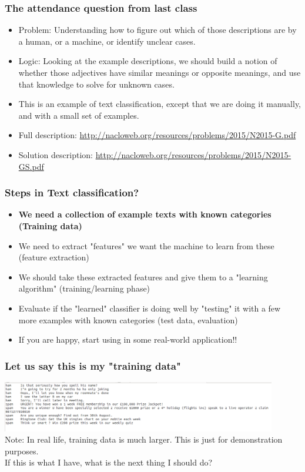 \documentclass{beamer}
\begin{document}
\begin{frame}
\frametitle{The attendance question from last class}
\begin{itemize}
\item Problem: Understanding how to figure out which of those descriptions are by a human, or a machine, or identify unclear cases.
\item Logic: Looking at the example descriptions, we should build a notion of whether those adjectives have similar meanings or opposite meanings, and use that knowledge to solve for unknown cases.
\item This is an example of text classification, except that we are doing it manually, and with a small set of examples. 
\item Full description: \url{http://nacloweb.org/resources/problems/2015/N2015-G.pdf}
\item Solution description: \url{http://nacloweb.org/resources/problems/2015/N2015-GS.pdf}
\end{itemize}
\end{frame}

\begin{frame}
\frametitle{Steps in Text classification?}
\begin{itemize}
\item \textbf{We need a collection of example texts with known categories (Training data)}
\item We need to extract "features" we want the machine to learn from these (feature extraction)
\item We should take these extracted features and give them to a "learning algorithm" (training/learning phase)
\item Evaluate if the "learned" classifier is doing well by "testing" it with a few more examples with known categories (test data, evaluation)
\item If you are happy, start using in some real-world application!!
\end{itemize}
\end{frame}

\begin{frame}
\frametitle{Let us say this is my "training data"}
\includegraphics[width=0.9\textwidth]{ham-spam-example.png} \\
Note: In real life, training data is much larger. This is just for demonstration purposes.
\\ \pause If this is what I have, what is the next thing I should do? 
\end{frame}
\end{document}
